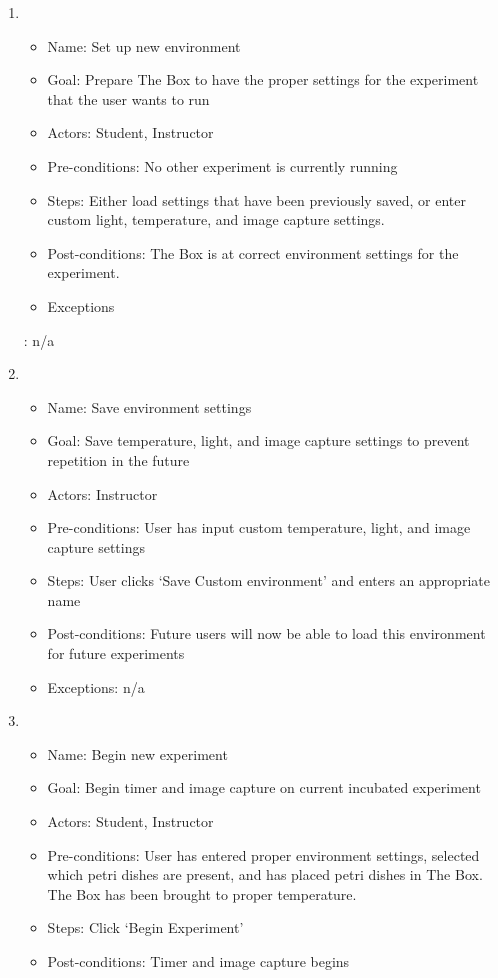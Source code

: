 \begin{enumerate}
	\item 
	\begin{itemize}
		\item Name: Set up new environment
		\item Goal: Prepare The Box to have the proper settings for the experiment that the user wants to run
		\item Actors: Student, Instructor
		\item Pre-conditions: No other experiment is currently running
		\item Steps: Either load settings that have been previously saved, or enter custom light, temperature, and image capture settings. 
		\item Post-conditions: The Box is at correct environment settings for the experiment.
		\item Exceptions
	\end{itemize}: n/a
	\item 
	\begin{itemize}
		\item Name: Save environment settings
		\item Goal: Save temperature, light, and image capture settings to prevent repetition in the future
		\item Actors: Instructor
		\item Pre-conditions: User has input custom temperature, light, and image capture settings
		\item Steps: User clicks `Save Custom environment' and enters an appropriate name
		\item Post-conditions: Future users will now be able to load this environment for future experiments
		\item Exceptions: n/a
	\end{itemize}
	\item 
	\begin{itemize}
		\item Name: Begin new experiment
		\item Goal: Begin timer and image capture on current incubated experiment
		\item Actors:  Student, Instructor
		\item Pre-conditions: User has entered proper environment settings, selected which petri dishes are present, and has placed petri dishes in The Box. The Box has been brought to proper temperature.
		\item Steps: Click `Begin Experiment'
		\item Post-conditions: Timer and image capture begins

\end{itemize}
\end{enumerate}
